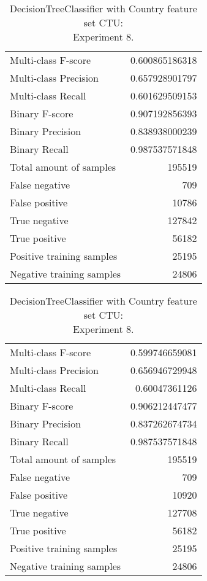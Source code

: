 \begin{table}[H]
\begin{minipage}{0.5\textwidth}
\caption{DecisionTreeClassifier with Country feature set CTU: \\Experiment 7.}
\centering
\begin{tabular}{l r}
\toprule
Multi-class F-score & 0.600865186318 \\
Multi-class Precision & 0.657928901797 \\
Multi-class Recall & 0.601629509153 \\
\midrule
Binary F-score & 0.907192856393 \\
Binary Precision & 0.838938000239 \\
Binary Recall & 0.987537571848 \\
\midrule
Total amount of samples & 195519 \\
False negative & 709 \\
False positive & 10786 \\
True negative & 127842 \\
True positive & 56182 \\
\midrule
Positive training samples & 25195 \\
Negative training samples & 24806 \\
\bottomrule
\end{tabular}
\end{minipage}
\hfillx
\begin{minipage}{0.5\textwidth}
\caption{DecisionTreeClassifier with Country feature set CTU: \\Experiment 8.}
\centering
\begin{tabular}{l r}
\toprule
Multi-class F-score & 0.599746659081 \\
Multi-class Precision & 0.656946729948 \\
Multi-class Recall & 0.60047361126 \\
\midrule
Binary F-score & 0.906212447477 \\
Binary Precision & 0.837262674734 \\
Binary Recall & 0.987537571848 \\
\midrule
Total amount of samples & 195519 \\
False negative & 709 \\
False positive & 10920 \\
True negative & 127708 \\
True positive & 56182 \\
\midrule
Positive training samples & 25195 \\
Negative training samples & 24806 \\
\bottomrule
\end{tabular}
\end{minipage}
\end{table}

